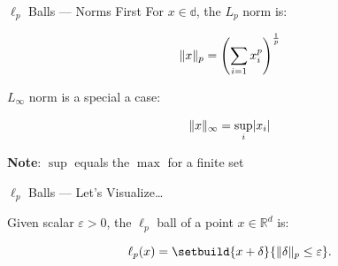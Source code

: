 \begin{frame}{$\ell_{p}$ Balls --- Norms First}
  For ${x \in \mathbb{d}}$, the $L_{p}$ norm is:

  \begin{equation}\label{eq:LpNorm}
    \lVert x\rVert_{p} = \left( \sum_{i=1} x_{i}^{p}  \right)^{\frac{1}{p}}
  \end{equation}

  $L_{\infty}$ norm is a special a case:

  \begin{equation}\label{eq:LinftyNorm}
    \lVert x\rVert_{\infty} = \sup_{i} \lvert x_i\rvert
  \end{equation}

  \begin{center}
    \textbf{Note}: $\sup$ equals the $\max$ for a finite set
  \end{center}
\end{frame}

\begin{frame}{$\ell_{p}$ Balls --- Let's Visualize\ldots}
  \begin{definition}
    Given scalar ${\varepsilon > 0}$, the $\ell_{p}$ ball of a point ${x \in \mathbb{R}^{d}}$ is:

    \begin{equation}\label{eq:LpBall}
      \ell_{p}(x) = \setbuild{x + \delta}{\norm{\delta}_{p} \leq \varepsilon}\text{.}
    \end{equation}
  \end{definition}

\end{frame}



